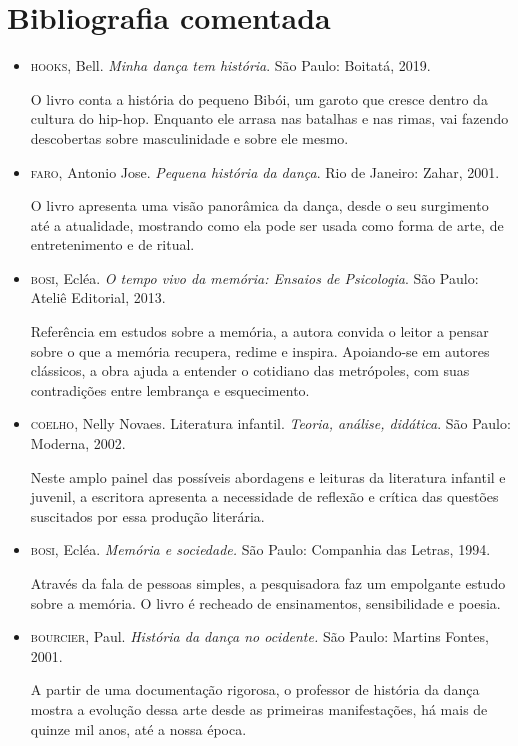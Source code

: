 \documentclass[12pt]{extarticle}
\begin{document}
\section{Bibliografia comentada}

\begin{itemize}


\item \textsc{hooks}, Bell. \emph{Minha dança tem história}. São Paulo:
  Boitatá, 2019.

O livro conta a história do pequeno Bibói, um garoto que cresce dentro
  da cultura do hip-hop. Enquanto ele arrasa nas batalhas e nas rimas, vai
  fazendo descobertas sobre masculinidade e sobre ele mesmo.

\item \textsc{faro}, Antonio Jose. \emph{Pequena história da dança}. Rio de Janeiro: Zahar,
  2001.

O livro apresenta uma visão panorâmica da dança, desde o seu surgimento
  até a atualidade, mostrando como ela pode ser usada como forma de arte, de
  entretenimento e de ritual.

\item \textsc{bosi}, Ecléa. \emph{O tempo vivo da memória: Ensaios de Psicologia}. São Paulo:
  Ateliê Editorial, 2013.

Referência em estudos sobre a memória, a autora convida o leitor a
  pensar sobre o que a memória recupera, redime e inspira. Apoiando-se em
  autores clássicos, a obra ajuda a entender o cotidiano das metrópoles, com
  suas contradições entre lembrança e esquecimento. 

\item  
\textsc{coelho}, Nelly Novaes. Literatura infantil. \emph{Teoria,
análise, didática}. São Paulo: Moderna, 2002.

Neste amplo painel das possíveis abordagens e leituras da literatura
infantil e juvenil, a escritora apresenta a necessidade de reflexão e crítica
das questões suscitados por essa produção literária.

\item
\textsc{bosi}, Ecléa. \emph{Memória e sociedade.} São Paulo: Companhia
das Letras, 1994.

Através da fala de pessoas simples, a pesquisadora faz um empolgante
estudo sobre a memória. O livro é recheado de ensinamentos, sensibilidade e
poesia.

\item
\textsc{bourcier}, Paul. \emph{História da dança no ocidente.} São Paulo:
Martins Fontes, 2001. 

A partir de uma documentação rigorosa, o professor de história da dança
mostra a evolução dessa arte desde as primeiras manifestações, há mais de
quinze mil anos, até a nossa época.

\end{itemize}
\end{document}
